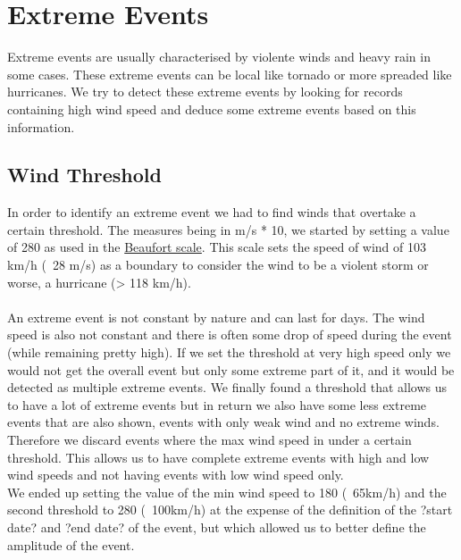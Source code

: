 \documentclass[12pt]{article}
\begin{document}
\section{Extreme Events}
\noindent
Extreme events are usually characterised by violente winds and heavy rain in some cases. These extreme events can be local like tornado or more spreaded like hurricanes. We try to detect these extreme events by looking for records containing high wind speed and deduce some extreme events based on this information.

\subsection{Wind Threshold}
In order to identify an extreme event we had to find winds that overtake a certain threshold. The measures being in m/s * 10, we started by setting a value of 280 as used in the \href{http://en.wikipedia.org/wiki/Beaufort_scale}{Beaufort scale}. This scale sets the speed of wind of 103 km/h (~28 m/s) as a boundary to consider the wind to be a violent storm or worse, a hurricane (> 118 km/h).\\
\\
An extreme event is not constant by nature and can last for days. The wind speed is also not constant and there is often some drop of speed during the event (while remaining pretty high). If we set the threshold at very high speed only we would not get the overall event but only some extreme part of it, and it would be detected as multiple extreme events. We finally found a threshold that allows us to have a lot of extreme events but in return we also have some less extreme events that are also shown, events with only weak wind and no extreme winds. Therefore we discard events where the max wind speed in under a certain threshold. This allows us to have complete extreme events with high and low wind speeds and not having events with low wind speed only.\\
We ended up setting the value of the min wind speed to 180 (~65km/h) and the second threshold to 280 (~100km/h) at the expense of the definition of the ?start date? and ?end date? of the event, but which allowed us to better define the amplitude of the event.

\end{document}
